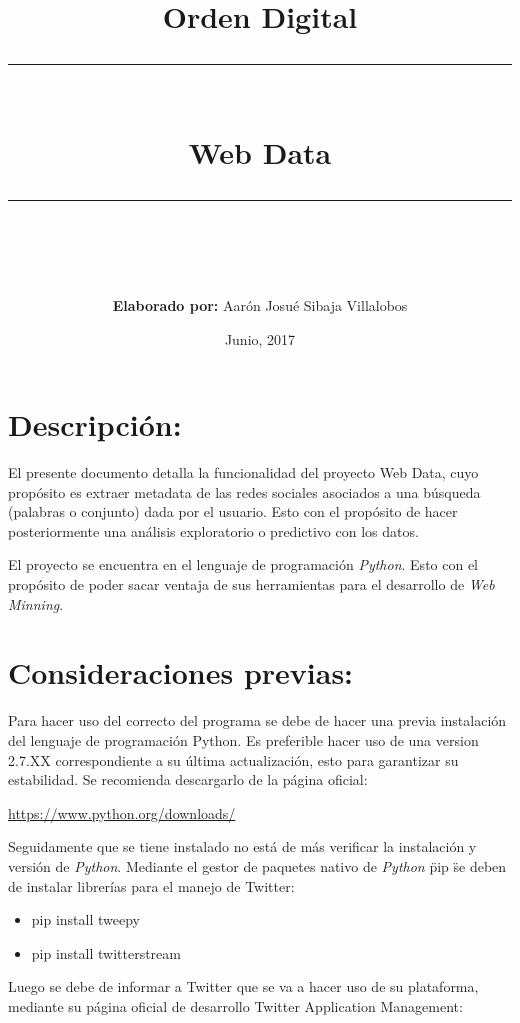 \documentclass[12pt,letterpaper]{article}
\author{ \textbf{Elaborado por: }Aarón Josué Sibaja Villalobos}
\title{Orden Digital \vspace{2cm}\\
\noindent\rule{13cm}{0.4pt} \\
 \textbf{Web Data}\\
\noindent\rule{13cm}{0.4pt}\\
\vspace{4cm}
 }
\date{\vspace{5cm} Junio, 2017 }
\begin{document}
\maketitle
\thispagestyle{empty}


\newpage
\setcounter{tocdepth}{3}
\tableofcontents
\newpage
\listoffigures

\newpage
\section{Descripción: }

El presente documento detalla  la funcionalidad del proyecto Web Data, cuyo propósito es extraer metadata de las redes sociales asociados a una búsqueda (palabras o conjunto) dada por el usuario. Esto con el propósito de hacer posteriormente una análisis exploratorio o predictivo con los datos. 

El proyecto se encuentra  en el lenguaje de programación \textit{Python}. Esto con el propósito de poder sacar ventaja de sus herramientas para el desarrollo de \textit{Web Minning}.

\section{Consideraciones previas:}
Para hacer uso del correcto del programa se debe de hacer una previa instalación del lenguaje de programación Python. Es preferible hacer uso de una version 2.7.XX correspondiente a su última actualización, esto para garantizar su estabilidad. Se recomienda descargarlo de la página oficial: 
\begin{center}

\url {https://www.python.org/downloads/} 
\end{center}

Seguidamente que se tiene instalado no está de más verificar la instalación y versión de \textit{Python}. Mediante el gestor de paquetes nativo de \textit{Python} \" pip \"se deben de instalar librerías para el manejo de Twitter:

\begin{itemize}
\item pip install tweepy
\item pip install twitterstream

\end{itemize} 


Luego se debe de informar a Twitter que se va a hacer uso de su plataforma, mediante su página oficial de desarrollo Twitter Application Management:
\end{document}
